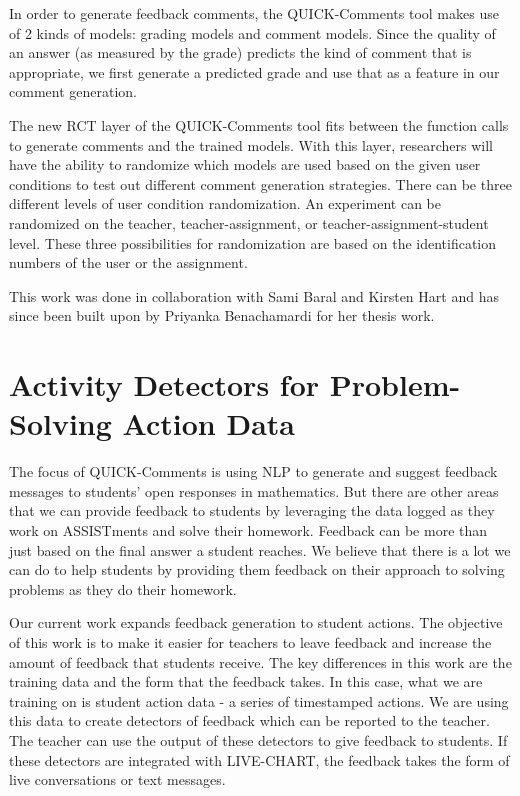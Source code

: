 \documentclass[12pt]{report}
\begin{document}
In order to generate feedback comments, the QUICK-Comments tool makes use of 2 kinds of models: grading models and comment models. Since the quality of an answer (as measured by the grade) predicts the kind of comment that is appropriate, we first generate a predicted grade and use that as a feature in our comment generation.  

The new RCT layer of the QUICK-Comments tool fits between the function calls to generate comments and the trained models. With this layer, researchers will have the ability to randomize which models are used based on the given user conditions to test out different comment generation strategies. There can be three different levels of user condition randomization. An experiment can be randomized on the teacher, teacher-assignment, or teacher-assignment-student level. These three possibilities for randomization are based on the identification numbers of the user or the assignment.

This work was done in collaboration with Sami Baral and Kirsten Hart and has since been built upon by Priyanka Benachamardi for her thesis work.

\chapter{Activity Detectors for Problem-Solving Action Data}
The focus of QUICK-Comments is using NLP to generate and suggest feedback messages to students' open responses in mathematics. But there are other areas that we can provide feedback to students by leveraging the data logged as they work on ASSISTments and solve their homework. Feedback can be more than just based on the final answer a student reaches. We believe that there is a lot we can do to help students by providing them feedback on their approach to solving problems as they do their homework.

Our current work expands feedback generation to student actions. The objective of this work is to make it easier for teachers to leave feedback and increase the amount of feedback that students receive. The key differences in this work are the training data and the form that the feedback takes. In this case, what we are training on is student action data - a series of timestamped actions. We are using this data to create detectors of feedback which can be reported to the teacher. The teacher can use the output of these detectors to give feedback to students. If these detectors are integrated with LIVE-CHART, the feedback takes the form of live conversations or text messages.
\end{document}
